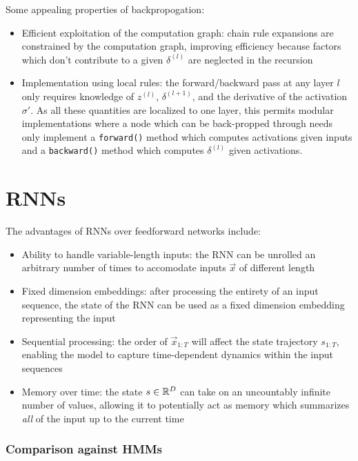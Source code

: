 \documentclass[dissertation.tex]{subfile}
\begin{document}
Some appealing properties of backpropogation:
\begin{itemize}
    \item Efficient exploitation of the computation graph: chain rule expansions
        are constrained by the computation graph, improving efficiency
        because factors which don't contribute to a given $\delta^{(l)}$
        are neglected in the recursion
    \item Implementation using local rules: the forward/backward pass
        at any layer $l$ only requires knowledge of $z^{(l)}$, $\delta^{(l+1)}$,
        and the derivative of the activation $\sigma'$. As all these quantities are localized
        to one layer, this permits modular implementations where a node which can be back-propped
        through needs only implement a \texttt{forward()} method which computes activations
        given inputs and a \texttt{backward()} method which computes $\delta^{(l)}$ given
        activations.
\end{itemize}


\section{RNNs}

The advantages of RNNs over feedforward networks include:
\begin{itemize}
    \item Ability to handle variable-length inputs: the RNN can be unrolled an arbitrary
        number of times to accomodate inputs $\vec{x}$ of different length
    \item Fixed dimension embeddings: after processing the entirety of an input
        sequence, the state of the RNN can be used as a fixed dimension embedding
        representing the input
    \item Sequential processing: the order of $\vec{x}_{1:T}$ will affect the state
        trajectory $s_{1:T}$, enabling the model to capture time-dependent dynamics
        within the input sequences
    \item Memory over time: the state $s \in \mathbb{R}^D$ can take on an uncountably infinite
        number of values, allowing it to potentially act as memory which summarizes
        \emph{all} of the input up to the current time
\end{itemize}

\subsubsection{Comparison against HMMs}
\end{document}
